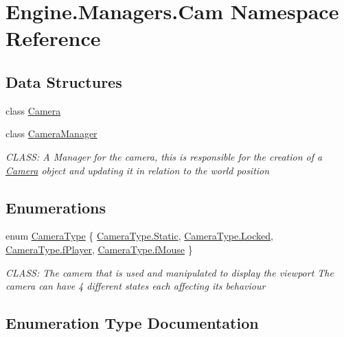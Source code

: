 \hypertarget{a00267}{}\section{Engine.\+Managers.\+Cam Namespace Reference}
\label{a00267}
\subsection*{Data Structures}
\begin{DoxyCompactItemize}
\item 
class \hyperlink{a00490}{Camera}
\item 
class \hyperlink{a00494}{Camera\+Manager}
\begin{DoxyCompactList}\small\item\em C\+L\+A\+SS\+: A Manager for the camera, this is responsible for the creation of a \hyperlink{a00490}{Camera} object and updating it in relation to the world position \end{DoxyCompactList}\end{DoxyCompactItemize}
\subsection*{Enumerations}
\begin{DoxyCompactItemize}
\item 
enum \hyperlink{a00267_aa40b88e1e953e36c54409ee9727c238b}{Camera\+Type} \{ \hyperlink{a00267_aa40b88e1e953e36c54409ee9727c238ba84a8921b25f505d0d2077aeb5db4bc16}{Camera\+Type.\+Static}, 
\hyperlink{a00267_aa40b88e1e953e36c54409ee9727c238bad0f2e5376298c880665077b565ffd7dd}{Camera\+Type.\+Locked}, 
\hyperlink{a00267_aa40b88e1e953e36c54409ee9727c238ba31cdf8a7c73745646adfa4b58fbfcecf}{Camera\+Type.\+f\+Player}, 
\hyperlink{a00267_aa40b88e1e953e36c54409ee9727c238ba63066f67ab8fc99b91bcaeb6559739af}{Camera\+Type.\+f\+Mouse}
 \}\begin{DoxyCompactList}\small\item\em C\+L\+A\+SS\+: The camera that is used and manipulated to display the viewport The camera can have 4 different states each affecting it\textquotesingle{}s behaviour \end{DoxyCompactList}
\end{DoxyCompactItemize}


\subsection{Enumeration Type Documentation}
\mbox{\label{a00267_aa40b88e1e953e36c54409ee9727c238b}} 
